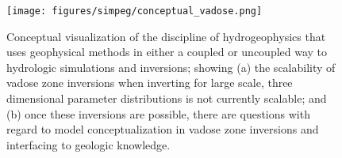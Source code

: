 \begin{figure}[!htbp]
\begin{center}
\texttt{[image: figures/simpeg/conceptual\_vadose.png]}
\end{center}
\caption{
Conceptual visualization of the discipline of hydrogeophysics that uses geophysical methods in either a coupled or uncoupled way to hydrologic simulations and inversions; showing (a) the scalability of vadose zone inversions when inverting for large scale, three dimensional parameter distributions is not currently scalable; and (b) once these inversions are possible, there are questions with regard to model conceptualization in vadose zone inversions and interfacing to geologic knowledge.
}
\label{fig:simpeg-conceptual_vadose}
\end{figure}
